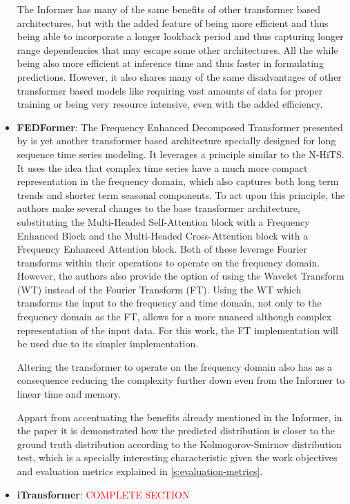 \begin{itemize}
    The Informer has many of the same benefits of other transformer based architectures, but with the added feature of being more efficient and thus being able to incorporate a longer lookback period and thus capturing longer range dependencies that may escape some other architectures. All the while being also more efficient at inference time and thus faster in formulating predictions. However, it also shares many of the same disadvantages of other transformer based models like requiring vast amounts of data for proper training or being very resource intensive, even with the added efficiency.  
    \item \textbf{FEDFormer}: The Frequency Enhanced Decomposed Transformer presented by \cite{zhou_ma_wen_wang_sun_jin_2022} is yet another transformer based architecture specially designed for long sequence time series modeling. It leverages a principle similar to the N-HiTS. It uses the idea that complex time series have a much more compact representation in the frequency domain, which also captures both long term trends and shorter term seasonal components. To act upon this principle, the authors make several changes to the base transformer architecture, substituting the Multi-Headed Self-Attention block with a Frequency Enhanced Block and the Multi-Headed Cross-Attention block with a Frequency Enhanced Attention block. Both of these leverage Fourier transforms within their operations to operate on the frequency domain. However, the authors also provide the option of using the Wavelet Transform (WT) instead of the Fourier Transform (FT). Using the WT which transforms the input to the frequency and time domain, not only to the frequency domain as the FT, allows for a more nuanced although complex representation of the input data. For this work, the FT implementation will be used due to its simpler implementation. 
    
    Altering the transformer to operate on the frequency domain also has as a consequence reducing the complexity further down even from the Informer to linear time and memory. 
    
    Appart from accentuating the benefits already mentioned in the Informer, in the paper it is demonstrated how the predicted distribution is closer to the ground truth distribution according to the Kolmogorov-Smirnov distribution test, which is a specially interesting characteristic given the work objectives and evaluation metrics explained in \autoref{s:evaluation-metrics}.

    \item \textbf{iTransformer}: \textcolor{red}{COMPLETE SECTION}
\end{itemize}

